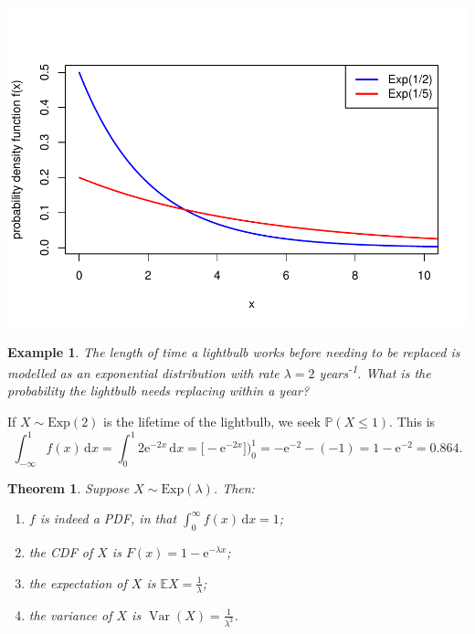 \documentclass[
  a4paper,
]{book}
\providecommand{\tightlist}{%
  \setlength{\itemsep}{0pt}\setlength{\parskip}{0pt}}
\newtheorem{theorem}{Theorem}[chapter]
\theoremstyle{definition}
\theoremstyle{definition}
\newtheorem{example}{Example}[chapter]
\theoremstyle{definition}
\theoremstyle{definition}
\theoremstyle{remark}
\begin{document}
\includegraphics{math1710_files/figure-latex/exp-pic-1.pdf}

\begin{example}
\emph{The length of time a lightbulb works before needing to be replaced is modelled as an exponential distribution with rate \(\lambda = 2\) years\textsuperscript{-1}. What is the probability the lightbulb needs replacing within a year?}

If \(X \sim \text{Exp}(2)\) is the lifetime of the lightbulb, we seek \(\mathbb P(X \leq 1)\). This is
\[ \int_{-\infty}^1 f(x)\, \mathrm{d}x = \int_0^1 2 \mathrm e^{-2x} \, \mathrm dx = \big[ -\mathrm e^{-2x} \big])_0^1 = -\mathrm e^{-2} -(-1) = 1 - \mathrm e^{-2} = 0.864.  \]
\end{example}

\begin{theorem}

Suppose \(X \sim \text{Exp}(\lambda)\). Then:

\begin{enumerate}
\def\labelenumi{\arabic{enumi}.}
\tightlist
\item
  \(f\) is indeed a PDF, in that \(\displaystyle\int_0^\infty f(x)\,\mathrm{d}x = 1\);
\item
  the CDF of \(X\) is \(F(x) = 1 - \mathrm{e}^{-\lambda x}\);
\item
  the expectation of \(X\) is \(\mathbb EX = \displaystyle\frac{1}{\lambda}\);
\item
  the variance of \(X\) is \(\operatorname{Var}(X) = \displaystyle\frac{1}{\lambda^2}\).
\end{enumerate}

\end{theorem}
\end{document}
